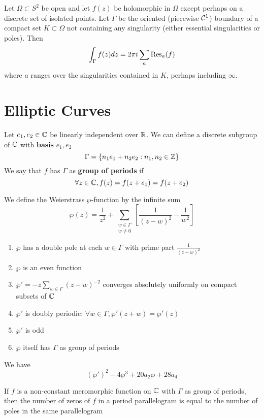 \documentclass{article}
\begin{document}
\begin{theorem}
  Let \(\Omega \subset S^2\) be open and let \(f(z)\) be holomorphic in \(\Omega\) except perhaps on a discrete set of isolated points. Let \(\Gamma\) be the oriented (piecewise \(\mathcal{C}^1\)) boundary of a compact set \(K \subset \Omega\) not containing any singularity (either essential singularities or poles). Then
  \begin{equation}
    \int_\Gamma f(z)dz = 2\pi i\sum_a\operatorname{Res}_a(f)
  \end{equation}
  where \(a\) ranges over the singularities contained in \(K\), perhaps including \(\infty\).
\end{theorem}

\section{Elliptic Curves}

\begin{definition}
  Let \(e_1, e_2 \in \mathbb{C}\) be linearly independent over \(\mathbb{R}\). We can define a discrete subgroup of \(\mathbb{C}\) with \textbf{basis} \(e_1, e_2\)
  \begin{equation}
    \Gamma = \{n_1e_1 + n_2e_2 : n_1, n_2 \in \mathbb{Z}\}
  \end{equation}
  We say that \(f\) has \(\Gamma\) as \textbf{group of periods} if
  \begin{equation}
    \forall z \in \mathbb{C}, f(z) = f(z + e_1) = f(z + e_2)
  \end{equation}
\end{definition}
\begin{definition}
  We define the Weierstrass \(\wp\)-function by the infinite sum
  \begin{equation}\wp(z) = \frac{1}{z^2} + \sum_{\substack{w \in \Gamma \\ w \neq 0}}\left[
    \frac{1}{(z - w)^2} - \frac{1}{w^2}
  \right]\end{equation}
\end{definition}
\begin{claim}
  \begin{enumerate}
    \item \(\wp\) has a double pole at each \(w \in \Gamma\) with prime part \(\frac{1}{(z - w)^2}\)
    \item \(\wp\) is an even function
    \item \(\wp' = -z\sum_{w \in \Gamma}(z - w)^{-2}\) converges absolutely uniformly on compact subsets of \(\mathbb{C}\)
    \item \(\wp'\) is doubly periodic: \(\forall w \in \Gamma, \wp'(z + w) = \wp'(z)\)
    \item \(\wp'\) is odd
    \item \(\wp\) itself has \(\Gamma\) as group of periods
  \end{enumerate}
\end{claim}
We have
\begin{equation}
  (\wp')^2 - 4\wp^3 + 20a_2\wp + 28a_4
\end{equation}

\begin{proposition}
  If \(f\) is a non-constant meromorphic function on \(\mathbb{C}\) with \(\Gamma\) as group of periods, then the number of zeros of \(f\) in a period parallelogram is equal to the number of poles in the same parallelogram
\end{proposition}
\end{document}
